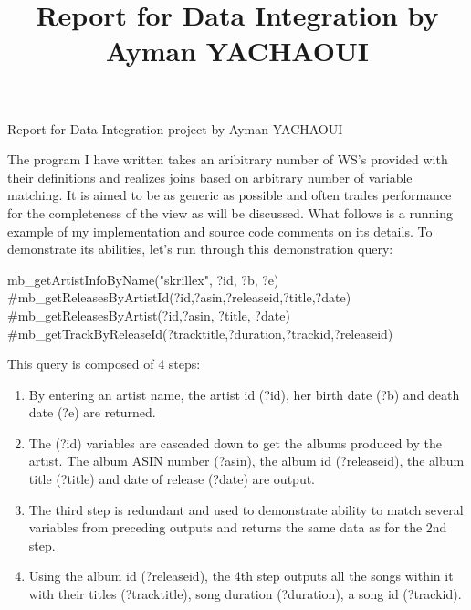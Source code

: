 \documentclass[11pt]{article}
\title{\vspace{0cm}  Report for Data Integration by Ayman YACHAOUI }
\date{}
\begin{document}

\pagestyle{empty}

\huge{Report for Data Integration project by Ayman YACHAOUI\\}
\normalsize {}

The program I have written takes an aribitrary number of WS's provided with their definitions and realizes joins based on arbitrary number of variable matching. It is aimed to be as generic as possible and often trades performance for the completeness of the view as will be discussed. What follows is a running example of my implementation and source code comments on its details. To demonstrate its abilities, let's run through this demonstration query:\\
\begin{center}
mb\_getArtistInfoByName("skrillex", ?id, ?b, ?e)\\
					\#mb\_getReleasesByArtistId(?id,?asin,?releaseid,?title,?date)\\
					\#mb\_getReleasesByArtist(?id,?asin, ?title, ?date)\\
					\#mb\_getTrackByReleaseId(?tracktitle,?duration,?trackid,?releaseid)\\
\end{center}
This query is composed of 4 steps:
\begin{enumerate}
\item By entering an artist name, the artist id (?id), her birth date (?b) and death date (?e) are returned.
\item The (?id) variables are cascaded down to get the albums produced by the artist. The album ASIN number (?asin), the album id (?releaseid), the album title (?title) and date of release (?date) are output.
\item The third step is redundant and used to demonstrate ability to match several variables from preceding outputs and returns the same data as for the 2nd step.
\item Using the album id (?releaseid), the 4th step outputs all the songs within it with their titles (?tracktitle), song duration (?duration), a song id (?trackid).
\end{enumerate}
\end{document}
